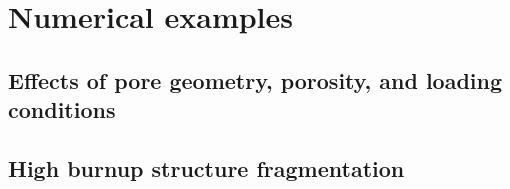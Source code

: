 \section{Numerical examples}
\label{section: brittle/examples}

\subsection{Effects of pore geometry, porosity, and loading conditions}

\subsection{High burnup structure fragmentation}
